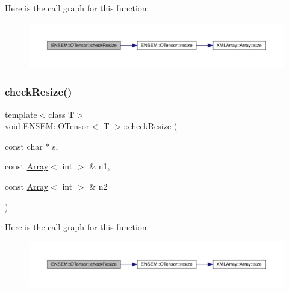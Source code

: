 Here is the call graph for this function\+:
\nopagebreak
\begin{figure}[H]
\begin{center}
\leavevmode
\includegraphics[width=350pt]{da/d8a/classENSEM_1_1OTensor_a0f656f8ef2b19a258a8c86a4e80ea902_cgraph}
\end{center}
\end{figure}
\mbox{\label{classENSEM_1_1OTensor_a0f656f8ef2b19a258a8c86a4e80ea902}} 
\subsubsection{\texorpdfstring{checkResize()}{checkResize()}\hspace{0.1cm}{\footnotesize\ttfamily [6/6]}}
{\footnotesize\ttfamily template$<$class T$>$ \\
void \mbox{\hyperlink{classENSEM_1_1OTensor}{E\+N\+S\+E\+M\+::\+O\+Tensor}}$<$ T $>$\+::check\+Resize (\begin{DoxyParamCaption}\item[{const char $\ast$}]{s,  }\item[{const \mbox{\hyperlink{classXMLArray_1_1Array}{Array}}$<$ int $>$ \&}]{n1,  }\item[{const \mbox{\hyperlink{classXMLArray_1_1Array}{Array}}$<$ int $>$ \&}]{n2 }\end{DoxyParamCaption})\hspace{0.3cm}{\ttfamily [inline]}}

Here is the call graph for this function\+:
\nopagebreak
\begin{figure}[H]
\begin{center}
\leavevmode
\includegraphics[width=350pt]{da/d8a/classENSEM_1_1OTensor_a0f656f8ef2b19a258a8c86a4e80ea902_cgraph}
\end{center}
\end{figure}
\mbox{\label{classENSEM_1_1OTensor_a09bfbf9385ec1bbe5050d4df43850f63}} 
